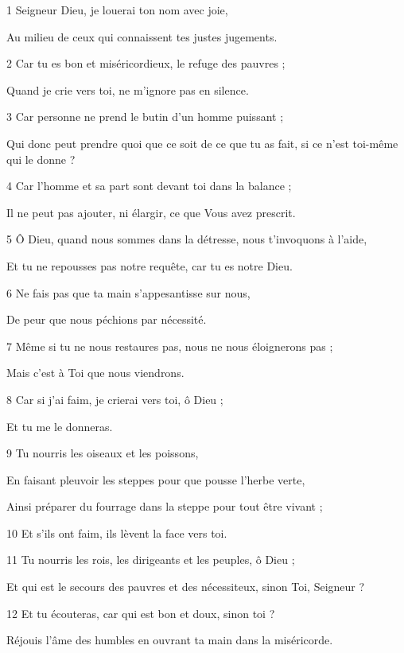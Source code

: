 \par 1 Seigneur Dieu, je louerai ton nom avec joie,
\par     Au milieu de ceux qui connaissent tes justes jugements.
\par 2 Car tu es bon et miséricordieux, le refuge des pauvres ;
\par     Quand je crie vers toi, ne m’ignore pas en silence.
\par 3 Car personne ne prend le butin d'un homme puissant ;
\par     Qui donc peut prendre quoi que ce soit de ce que tu as fait, si ce n'est toi-même qui le donne ?
\par 4 Car l'homme et sa part sont devant toi dans la balance ;
\par     Il ne peut pas ajouter, ni élargir, ce que Vous avez prescrit.
\par   
\par 5 Ô Dieu, quand nous sommes dans la détresse, nous t'invoquons à l'aide,
\par     Et tu ne repousses pas notre requête, car tu es notre Dieu.
\par 6 Ne fais pas que ta main s'appesantisse sur nous,
\par     De peur que nous péchions par nécessité.
\par 7 Même si tu ne nous restaures pas, nous ne nous éloignerons pas ;
\par     Mais c'est à Toi que nous viendrons.
\par 8 Car si j'ai faim, je crierai vers toi, ô Dieu ;
\par     Et tu me le donneras.
\par   
\par 9 Tu nourris les oiseaux et les poissons,
\par     En faisant pleuvoir les steppes pour que pousse l'herbe verte,
\par     Ainsi préparer du fourrage dans la steppe pour tout être vivant ;
\par 10 Et s'ils ont faim, ils lèvent la face vers toi.
\par 11 Tu nourris les rois, les dirigeants et les peuples, ô Dieu ;
\par     Et qui est le secours des pauvres et des nécessiteux, sinon Toi, Seigneur ?
\par 12 Et tu écouteras, car qui est bon et doux, sinon toi ?
\par     Réjouis l'âme des humbles en ouvrant ta main dans la miséricorde.
\par   
